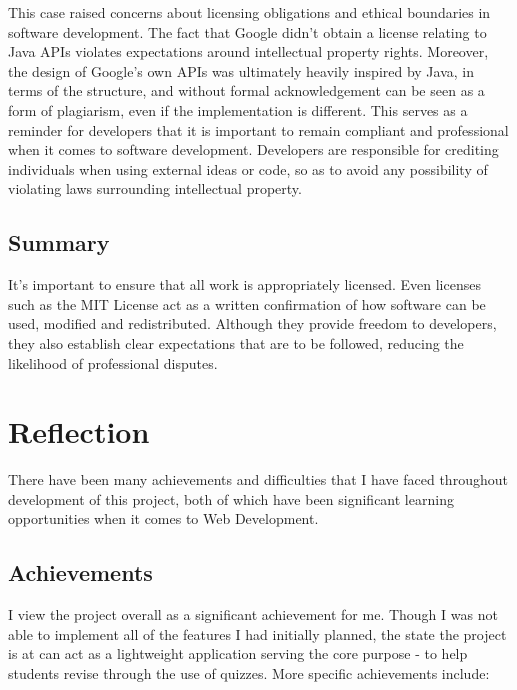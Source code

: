 \documentclass[]{final_report}
\begin{document}
This case raised concerns about licensing obligations and ethical boundaries in software development. The fact that Google didn't obtain a license relating to Java APIs violates expectations around intellectual property rights. Moreover, the design of Google's own APIs was ultimately heavily inspired by Java, in terms of the structure, and without formal acknowledgement can be seen as a form of plagiarism, even if the implementation is different. This serves as a reminder for developers that it is important to remain compliant and professional when it comes to software development. Developers are responsible for crediting individuals when using external ideas or code, so as to avoid any possibility of violating laws surrounding intellectual property.

\section{Summary}

It's important to ensure that all work is appropriately licensed. Even licenses such as the MIT License act as a written confirmation of how software can be used, modified and redistributed. Although they provide freedom to developers, they also establish clear expectations that are to be followed, reducing the likelihood of professional disputes.

\chapter{Reflection}

There have been many achievements and difficulties that I have faced throughout development of this project, both of which have been significant learning opportunities when it comes to Web Development. 

\section{Achievements}

I view the project overall as a significant achievement for me. Though I was not able to implement all of the features I had initially planned, the state the project is at can act as a lightweight application serving the core purpose - to help students revise through the use of quizzes. More specific achievements include:
\end{document}
